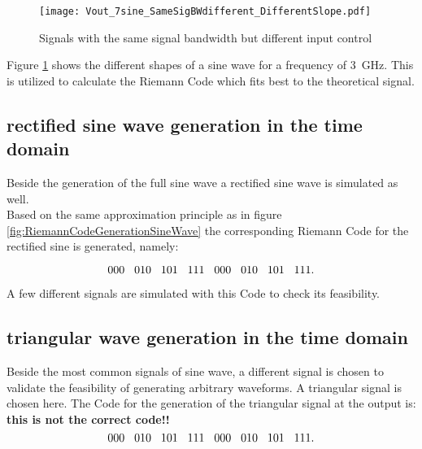 \begin{figure}[htb!]
	\centering
  \texttt{[image: Vout\_7sine\_SameSigBWdifferent\_DifferentSlope.pdf]}
	\caption{Signals with the same signal bandwidth but different input control}
	\label{fig:SameSigBWDifSlope}
\end{figure}

Figure \ref{fig:SameSigBWDifSlope} shows the different shapes of a sine wave for a frequency of \SI{3}{\GHz}.
This is utilized to calculate the Riemann Code which fits best to the theoretical signal.


\subsection{rectified sine wave generation in the time domain}
Beside the generation of the full sine wave a rectified sine wave is simulated as well.\\
Based on the same approximation principle as in figure \ref{fig:RiemannCodeGenerationSineWave} the corresponding Riemann Code for the rectified sine is generated, namely:

\begin{equation}
 000\hspace{.3cm} 010\hspace{.3cm} 101\hspace{.3cm} 111\hspace{.3cm} 000\hspace{.3cm} 010\hspace{.3cm} 101\hspace{.3cm} 111.
\end{equation}
\label{eq:RiemannCodeRectSine}

A few different signals are simulated with this Code to check its feasibility.




\subsection{triangular wave generation in the time domain}
Beside the most common signals of sine wave, a different signal is chosen to validate the feasibility of generating arbitrary waveforms.
A triangular signal is chosen here.
The Code for the generation of the triangular signal at the output is:
\textbf{this is not the correct code!!}
\begin{equation}
 000\hspace{.3cm} 010\hspace{.3cm} 101\hspace{.3cm} 111\hspace{.3cm} 000\hspace{.3cm} 010\hspace{.3cm} 101\hspace{.3cm} 111.
\end{equation}
\label{eq:RiemannCodeRectSine}

